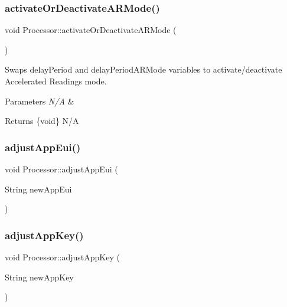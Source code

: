 \subsubsection{\texorpdfstring{activate\+Or\+Deactivate\+A\+R\+Mode()}{activateOrDeactivateARMode()}}
{\footnotesize\ttfamily void Processor\+::activate\+Or\+Deactivate\+A\+R\+Mode (\begin{DoxyParamCaption}{ }\end{DoxyParamCaption})}

Swaps delay\+Period and delay\+Period\+A\+R\+Mode variables to activate/deactivate Accelerated Readings mode. 
\begin{DoxyParams}{Parameters}
{\em N/A} & \\
\hline
\end{DoxyParams}
\begin{DoxyReturn}{Returns}
\{void\} N/A 
\end{DoxyReturn}
\mbox{\label{class_processor_a9e5c642ce356b8aebe5998158f31ded5}} 
\subsubsection{\texorpdfstring{adjust\+App\+Eui()}{adjustAppEui()}}
{\footnotesize\ttfamily void Processor\+::adjust\+App\+Eui (\begin{DoxyParamCaption}\item[{String}]{new\+App\+Eui }\end{DoxyParamCaption})}

\mbox{\label{class_processor_adee07912124face3700bc988606b8f38}} 
\subsubsection{\texorpdfstring{adjust\+App\+Key()}{adjustAppKey()}}
{\footnotesize\ttfamily void Processor\+::adjust\+App\+Key (\begin{DoxyParamCaption}\item[{String}]{new\+App\+Key }\end{DoxyParamCaption})}

\mbox{\label{class_processor_a527c24bbc2784d267d9ff2b21fd21379}} 
